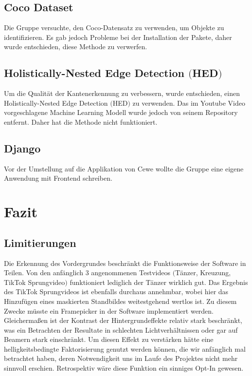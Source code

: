 \documentclass[12pt]{scrartcl}
\begin{document}
\subsection{Coco Dataset}
Die Gruppe versuchte, den Coco-Datensatz zu verwenden, um Objekte zu identifizieren. Es gab jedoch Probleme bei der Installation der Pakete, daher wurde entschieden, diese Methode zu verwerfen.
\subsection{Holistically-Nested Edge Detection $($HED$)$}
Um die Qualit\"at der Kantenerkennung zu verbessern, wurde entschieden, einen Holistically-Nested Edge Detection $($HED$)$ zu verwenden. Das im Youtube Video vorgeschlagene Machine Learning Modell wurde jedoch von seinem Repository entfernt. Daher hat die Methode nicht funktioniert.
\subsection{Django}
Vor der Umstellung auf die Applikation von Cewe wollte die Gruppe eine eigene Anwendung mit Frontend schreiben.




\section{Fazit}
\subsection{Limitierungen}
Die Erkennung des Vordergrundes beschr\"ankt die Funktionsweise der Software in Teilen. Von den anf\"anglich 3 angenommenen Testvideos
$ ( $T\"anzer, Kreuzung, TikTok Sprungvideo$ ) $ funktioniert lediglich der T\"anzer wirklich gut. Das Ergebnis des TikTok Sprungvideos ist
ebenfalls durchaus annehmbar, wobei hier das Hinzuf\"ugen eines maskierten Standbildes weitestgehend wertlos ist. Zu diesem Zwecke m\"usste ein Framepicker in der Software implementiert werden. Gleicherma{\ss}en ist der Kontrast der Hintergrundeffekte relativ stark beschr\"ankt, was ein Betrachten der Resultate in schlechten Lichtverh\"altnissen oder gar auf Beamern stark einschr\"ankt. Um diesen Effekt zu verst\"arken h\"atte eine helligkeitsbedingte Faktorisierung genutzt werden k\"onnen, die wir anf\"anglich mal betrachtet haben, deren Notwendigkeit uns im Laufe des Projektes nicht mehr sinnvoll erschien. Retrospektiv w\"are diese Funktion ein sinniges Opt-In gewesen.
\end{document}
